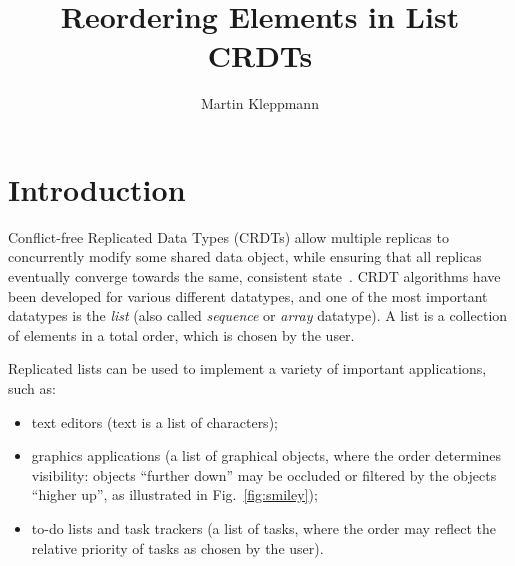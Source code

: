 \documentclass[sigplan,10pt]{acmart}
\begin{document}
\title{Reordering Elements in List CRDTs}

\author{Martin Kleppmann}

\begin{abstract}
\end{abstract}

\maketitle

\section{Introduction}

Conflict-free Replicated Data Types (CRDTs) allow multiple replicas to concurrently modify some shared data object, while ensuring that all replicas eventually converge towards the same, consistent state~\cite{Shapiro:2011un}.
CRDT algorithms have been developed for various different datatypes, and one of the most important datatypes is the \emph{list} (also called \emph{sequence} or \emph{array} datatype).
A list is a collection of elements in a total order, which is chosen by the user.

Replicated lists can be used to implement a variety of important applications, such as:
\begin{itemize}
    \item text editors (text is a list of characters);
    \item graphics applications (a list of graphical objects, where the order determines visibility: objects ``further down'' may be occluded or filtered by the objects ``higher up'', as illustrated in Fig.~\ref{fig:smiley});
    \item to-do lists and task trackers (a list of tasks, where the order may reflect the relative priority of tasks as chosen by the user).
\end{itemize}
\end{document}
